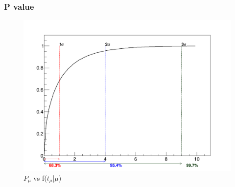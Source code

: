 \documentclass[11pt]{beamer}
\begin{document}
\begin{frame}
\frametitle{P value}
\begin{center}
\begin{figure}
\includegraphics[scale=0.25]{figures/nos.png}
\caption{$P_\mu$ vs  f($t_\mu$|$\mu$)}	
\end{figure}
\end{center}
\end{frame}
\end{document}
